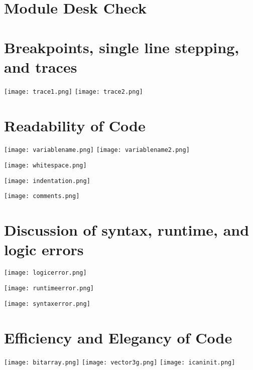 \documentclass[12pt, DIV=calc]{scrartcl}
\begin{document}
\clearpage
\section{Module Desk Check}

\clearpage
\section{Breakpoints, single line stepping, and traces}

\texttt{[image: trace1.png]}
\texttt{[image: trace2.png]}

\clearpage
\section{Readability of Code}

\texttt{[image: variablename.png]}
\texttt{[image: variablename2.png]}

\texttt{[image: whitespace.png]}

\texttt{[image: indentation.png]}

\texttt{[image: comments.png]} %



\clearpage
\section{Discussion of syntax, runtime, and logic errors}

\texttt{[image: logicerror.png]}

\texttt{[image: runtimeerror.png]}

\texttt{[image: syntaxerror.png]}





\clearpage
\section{Efficiency and Elegancy of Code}

\texttt{[image: bitarray.png]}
\texttt{[image: vector3g.png]}
\texttt{[image: icaninit.png]}
\end{document}

